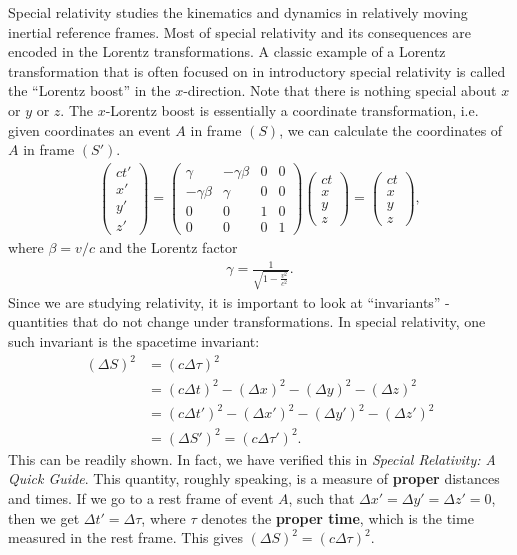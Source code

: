 \documentclass{book}
\theoremstyle{definition}
\newcommand{\x}{\xi}
\begin{document}
Special relativity studies the kinematics and dynamics in relatively moving inertial reference frames. Most of special relativity and its consequences are encoded in the Lorentz transformations. A classic example of a Lorentz transformation that is often focused on in introductory special relativity is called the ``Lorentz boost'' in the $x$-direction. Note that there is nothing special about $x$ or $y$ or $z$. The $x$-Lorentz boost is essentially a coordinate transformation, i.e. given coordinates an event $A$ in frame $(S)$, we can calculate the coordinates of $A$ in frame $(S')$.
\begin{align*}
\begin{pmatrix}
ct'\\x'\\y'\\z'
\end{pmatrix}
=
\begin{pmatrix}
\gamma & -\gamma\beta & 0 & 0\\
-\gamma\beta & \gamma & 0 & 0\\
0 & 0 & 1 & 0\\
0 & 0 & 0 & 1
\end{pmatrix}
\begin{pmatrix}
ct\\x\\y\\z
\end{pmatrix}
=
\begin{pmatrix}
ct\\x\\y\\z
\end{pmatrix},
\end{align*}
where $\beta = v/c$ and the Lorentz factor 
\begin{align*}
\gamma = \frac{1}{\sqrt{1-\frac{v^2}{c^2}}}.
\end{align*}
Since we are studying relativity, it is important to look at ``invariants'' - quantities that do not change under transformations. In special relativity, one such invariant is the spacetime invariant:
\begin{align*}
(\Delta S)^2 &= (c\Delta \tau)^2\\
&= (c\Delta t)^2 - (\Delta x)^2 - (\Delta y)^2 - (\Delta z)^2\\
&= (c\Delta t')^2 - (\Delta x')^2 - (\Delta y')^2 - (\Delta z')^2\\
&= (\Delta S')^2 = (c\Delta \tau')^2.
\end{align*}
This can be readily shown. In fact, we have verified this in \textit{Special Relativity: A Quick Guide}. This quantity, roughly speaking, is a measure of \textbf{proper} distances and times. If we go to a rest frame of event $A$, such that $\Delta x' = \Delta y' = \Delta z' = 0$, then we get $\Delta t' = \Delta \tau$, where $\tau$ denotes the \textbf{proper time}, which is the time measured in the rest frame. This gives $(\Delta S)^2 = (c\Delta \tau)^2$.\\
\end{document}
